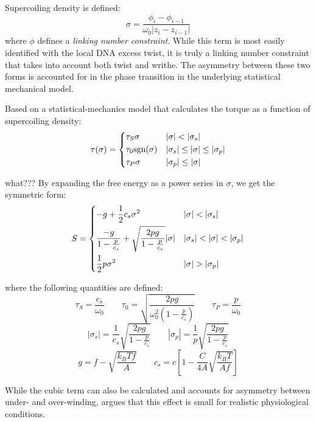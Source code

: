 \documentclass[11pt]{article}
\begin{document}
Supercoiling density is defined:
\begin{equation}
    \sigma = \frac{\phi_i - \phi_{i - 1}}{\omega_0 | z_{i} - z_{i-1}|}
    \label{eq:sc_density}
\end{equation}
where \(\phi\) defines a \emph{linking number constraint}. While this term is most easily identified with the local DNA excess twist, it is truly a linking number constraint that takes into account both twist and writhe. The asymmetry between these two forms is accounted for in the phase transition in the underlying statistical mechanical model.

Based on a statistical-mechanics model that calculates the torque as a function of supercoiling density:
\begin{equation}
    \tau(\sigma) = \begin{dcases} \tau_S \sigma & |\sigma| < |\sigma_s| \\ \tau_0 \text{sgn}(\sigma) & |\sigma_s| \leq |\sigma | \leq |\sigma_p| \\ \tau_P \sigma & |\sigma_p| \leq |\sigma|\end{dcases}
\end{equation}

what???
By expanding the free energy as a power series in \(\sigma\), we get the symmetric form:
\begin{equation}
    S = \begin{dcases}
        -g + \frac{1}{2} c_s \sigma^2 & |\sigma| < |\sigma_s| \\
        \frac{-g}{1 - \frac{p}{c_s}} + \sqrt{\frac{2 p g}{1 - \frac{p}{c_s}}} |\sigma| & |\sigma_s| < |\sigma| < |\sigma_p| \\
        \frac{1}{2} p \sigma^2 & |\sigma| > |\sigma_p|
    \end{dcases}
\end{equation}

where the following quantities are defined:
\[\tau_S = \frac{c_s}{\omega_0} \qquad \tau_0 = \sqrt{\frac{2 pg}{\omega_0^2 \left(1 - \frac{p}{c_s}\right)}} \qquad \tau_P = \frac{p}{\omega_0} \]
\[|\sigma_s| = \frac{1}{c_s} \sqrt{\frac{2pg}{1 - \frac{p}{c_s}}} \qquad |\sigma_p| = \frac{1}{p} \sqrt{\frac{2pg}{1 - \frac{p}{c_s}}}\]
\[g = f - \sqrt{\frac{k_B T f}{A}} \qquad c_s = c \left[1 - \frac{C}{4A} \sqrt{\frac{k_B T}{A f}}\right]\]


While the cubic term can also be calculated and accounts for asymmetry between under- and over-winding, \textcite{markoTorqueDynamicsLinking2007} argues that this effect is small for realistic physiological conditions.
\end{document}
